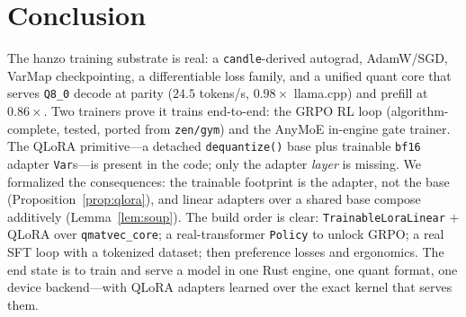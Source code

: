 \documentclass[11pt]{article}
\begin{document}
\section{Conclusion}

The hanzo training substrate is real: a \texttt{candle}-derived autograd, AdamW/SGD, VarMap checkpointing, a differentiable loss family, and a unified quant core that serves \texttt{Q8\_0} decode at parity ($24.5$ tokens/s, $0.98\times$ llama.cpp) and prefill at $0.86\times$. Two trainers prove it trains end-to-end: the GRPO RL loop (algorithm-complete, tested, ported from \texttt{zen/gym}) and the AnyMoE in-engine gate trainer. The QLoRA primitive---a detached \texttt{dequantize()} base plus trainable \texttt{bf16} adapter \texttt{Var}s---is present in the code; only the adapter \emph{layer} is missing. We formalized the consequences: the trainable footprint is the adapter, not the base (Proposition~\ref{prop:qlora}), and linear adapters over a shared base compose additively (Lemma~\ref{lem:soup}). The build order is clear: \texttt{TrainableLoraLinear} $+$ QLoRA over \texttt{qmatvec\_core}; a real-transformer \texttt{Policy} to unlock GRPO; a real SFT loop with a tokenized dataset; then preference losses and ergonomics. The end state is to train and serve a model in one Rust engine, one quant format, one device backend---with QLoRA adapters learned over the exact kernel that serves them.
\end{document}
